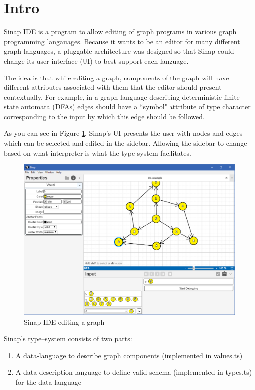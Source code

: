 \documentclass{article}
\begin{document}
\section{Intro}

Sinap IDE is a program to allow editing of graph
programs in various graph programming langauages. 
Because it wants to be an editor for many different
graph-languages, a pluggable architecture was designed
so that Sinap could change its user interface (UI)
to best support each language. 

The idea is that while editing a graph, components of the
graph will have different attributes associated with them 
that the editor should present contextually. For example, in
a graph-language describing deterministic finite-state 
automata (DFAs) edges should have a ``symbol" attribute of 
type character corresponding to the input by which this 
edge should be followed. 

As you can see in Figure \ref{sinap-screenshot}, Sinap's UI
presents the user with nodes and edges which can be selected 
and edited in the sidebar. Allowing the sidebar to change based
on what interpreter is what the type-system facilitates. 

\begin{figure} 
    \label{sinap-screenshot}  
    \includegraphics[width=\textwidth]{sinap-screenshot}
    \caption{Sinap IDE editing a graph}
\end{figure}
    
Sinap's type–system consists of two parts:

\begin{enumerate}
    \item A data-language to describe graph components 
    (implemented in values.ts)
    \item A data-description language to define valid schema 
    (implemented in types.ts)
    for the data language
\end{enumerate}
\end{document}
